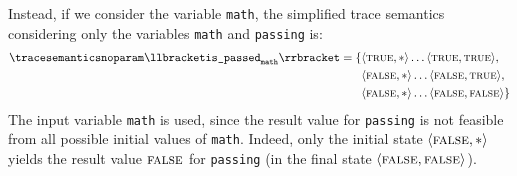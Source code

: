\begin{example}
Instead, if we consider the variable \texttt{math}, the simplified trace semantics considering only the variables \texttt{math} and \texttt{passing} is:
\begin{align*}
  \tracesemanticsnoparam\semanticsof{\texttt{is\_passed}_\texttt{math}}
  =
  \{
    &\tuple\true\anyvalue\dots\tuple\true\true, \\
    &\tuple\false\anyvalue\dots\tuple\false\true, \\
    &\tuple\false\anyvalue\dots\tuple\false\false
  \}
\end{align*}
The input variable \texttt{math} is used, since the result value for \texttt{passing} is not feasible from all possible initial values of \texttt{math}.
Indeed, only the initial state $\langle \textsc{false}, {*} \rangle$ yields the result value $\textsc{false}$ for \texttt{passing} (in the final state $\langle \textsc{false}, \textsc{false} \rangle$).
\end{example}

